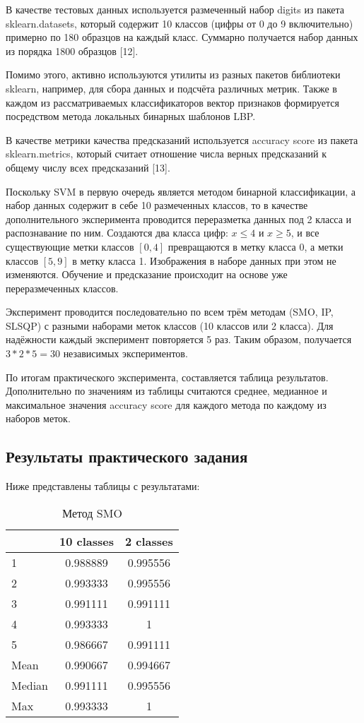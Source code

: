 \documentclass[main.tex]{subfiles}
\begin{document}
В качестве тестовых данных используется размеченный набор digits из пакета sklearn.datasets, который содержит 10 классов (цифры от 0 до 9 включительно) примерно по 180 образцов на каждый класс. Суммарно получается набор данных из порядка 1800 образцов [12].

Помимо этого, активно используются утилиты из разных пакетов библиотеки sklearn, например, для сбора данных и подсчёта различных метрик. Также в каждом из рассматриваемых классификаторов вектор признаков формируется посредством метода локальных бинарных шаблонов LBP.

В качестве метрики качества предсказаний используется accuracy score из пакета sklearn.metrics, который считает отношение числа верных предсказаний к общему числу всех предсказаний [13].

Поскольку SVM в первую очередь является методом бинарной классификации, а набор данных содержит в себе 10 размеченных классов, то в качестве дополнительного эксперимента проводится переразметка данных под 2 класса и распознавание по ним. Создаются два класса цифр: $x \leq 4$ и $x \geq 5$, и все существующие метки классов $[0, 4]$ превращаются в метку класса 0, а метки классов $[5, 9]$ в метку класса 1. Изображения в наборе данных при этом не изменяются. Обучение и предсказание происходит на основе уже переразмеченных классов.

Эксперимент проводится последовательно по всем трём методам (SMO, IP, SLSQP) с разными наборами меток классов (10 классов или 2 класса). Для надёжности каждый эксперимент повторяется 5 раз. Таким образом, получается $3 * 2 * 5 = 30$ независимых экспериментов.

По итогам практического эксперимента, составляется таблица результатов. Дополнительно по значениям из таблицы считаются среднее, медианное и максимальное значения accuracy score для каждого метода по каждому из наборов меток.

\subsection{Результаты практического задания}
Ниже представлены таблицы с результатами:

\begin{table}[H]
    \centering
    \begin{tabular}{|l||c|c|}
        \hline
        & 10 classes & 2 classes \\\hline\hline
        1 & 0.988889 & 0.995556 \\\hline
        2 & 0.993333 & 0.995556 \\\hline
        3 & 0.991111 & 0.991111 \\\hline
        4 & 0.993333 & 1 \\\hline
        5 & 0.986667 & 0.991111 \\\hline
        Mean & 0.990667 & 0.994667 \\\hline
        Median & 0.991111 & 0.995556 \\\hline
        Max & 0.993333 & 1 \\\hline
    \end{tabular}
    \caption{Метод SMO}
\end{table}
\end{document}
